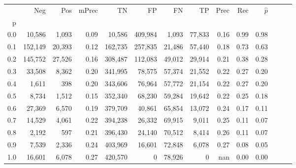 \begin{tabular}{rrrrrrrrrrrrrr}
\toprule
{} &      Neg &     Pos & mPrec &       TN &       FP &      FN &      TP &  Prec &   Rec & $\hat{p}$ \\
p   &          &         &       &          &          &         &         &       &       &           \\
\midrule
0.0 &   10,586 &   1,093 &  0.09 &   10,586 &  409,984 &   1,093 &  77,833 &  0.16 &  0.99 &      0.98 \\
0.1 &  152,149 &  20,393 &  0.12 &  162,735 &  257,835 &  21,486 &  57,440 &  0.18 &  0.73 &      0.63 \\
0.2 &  145,752 &  27,526 &  0.16 &  308,487 &  112,083 &  49,012 &  29,914 &  0.21 &  0.38 &      0.28 \\
0.3 &   33,508 &   8,362 &  0.20 &  341,995 &   78,575 &  57,374 &  21,552 &  0.22 &  0.27 &      0.20 \\
0.4 &    1,611 &     398 &  0.20 &  343,606 &   76,964 &  57,772 &  21,154 &  0.22 &  0.27 &      0.20 \\
0.5 &    8,734 &   1,512 &  0.15 &  352,340 &   68,230 &  59,284 &  19,642 &  0.22 &  0.25 &      0.18 \\
0.6 &   27,369 &   6,570 &  0.19 &  379,709 &   40,861 &  65,854 &  13,072 &  0.24 &  0.17 &      0.11 \\
0.7 &   14,529 &   4,061 &  0.22 &  394,238 &   26,332 &  69,915 &   9,011 &  0.25 &  0.11 &      0.07 \\
0.8 &    2,192 &     597 &  0.21 &  396,430 &   24,140 &  70,512 &   8,414 &  0.26 &  0.11 &      0.07 \\
0.9 &    7,539 &   2,336 &  0.24 &  403,969 &   16,601 &  72,848 &   6,078 &  0.27 &  0.08 &      0.05 \\
1.0 &   16,601 &   6,078 &  0.27 &  420,570 &        0 &  78,926 &       0 &   nan &  0.00 &      0.00 \\
\bottomrule
\end{tabular}
